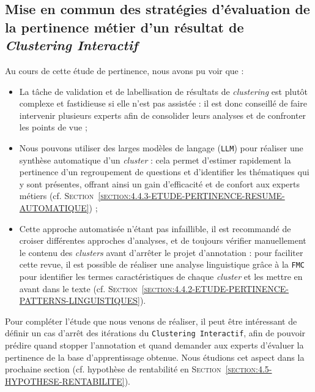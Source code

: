 		
	\subsection{Mise en commun des stratégies d'évaluation de la pertinence métier d'un résultat de \textit{Clustering Interactif}}
	\label{section:4.4.4-ETUDE-PERTINENCE-MISE-EN-COMMUN}
			
		\begin{leftBarSummary}
			Au cours de cette étude de pertinence, nous avons pu voir que :
			\begin{itemize}
				\item[\itemok] La tâche de validation et de labellisation de résultats de \textit{clustering} est plutôt complexe et fastidieuse si elle n'est pas assistée : il est donc conseillé de faire intervenir plusieurs experts afin de consolider leurs analyses et de confronter les points de vue ;
				\item[\itemok] Nous pouvons utiliser des larges modèles de langage (\texttt{LLM}) pour réaliser une synthèse automatique d'un \textit{cluster} : cela permet d'estimer rapidement la pertinence d'un regroupement de questions et d'identifier les thématiques qui y sont présentes, offrant ainsi un gain d'efficacité et de confort aux experts métiers (cf. \textsc{Section~\ref{section:4.4.3-ETUDE-PERTINENCE-RESUME-AUTOMATIQUE}}) ;
				\item[\itemok] Cette approche automatisée n'étant pas infaillible, il est recommandé de croiser différentes approches d'analyses, et de toujours vérifier manuellement le contenu des \textit{clusters} avant d'arrêter le projet d'annotation : pour faciliter cette revue, il est possible de réaliser une analyse linguistique grâce à la \texttt{FMC} pour identifier les termes caractéristiques de chaque \textit{cluster} et les mettre en avant dans le texte (cf. \textsc{Section~\ref{section:4.4.2-ETUDE-PERTINENCE-PATTERNS-LINGUISTIQUES}}).
			\end{itemize}
		\end{leftBarSummary}
		
		Pour compléter l'étude que nous venons de réaliser, il peut être intéressant de définir un cas d'arrêt des itérations du \texttt{Clustering Interactif}, afin de pouvoir prédire quand stopper l'annotation et quand demander aux experts d'évaluer la pertinence de la base d'apprentissage obtenue.
		Nous étudions cet aspect dans la prochaine section (cf. hypothèse de rentabilité en \textsc{Section~\ref{section:4.5-HYPOTHESE-RENTABILITE}}).
		